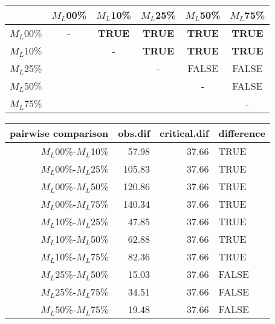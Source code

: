 \begin{tabular}{c|ccccc}
    \hline
              & $M_L$00\% & $M_L$10\% & $M_L$25\% & $M_L$50\% & $M_L$75\% \\
    \hline
    $M_L$00\% & - & \textbf{TRUE} & \textbf{TRUE} & \textbf{TRUE} & \textbf{TRUE}\\
    $M_L$10\% & & - & \textbf{TRUE} & \textbf{TRUE} & \textbf{TRUE} \\
    $M_L$25\% & & & - & FALSE & FALSE \\
    $M_L$50\% & & & & - & FALSE \\
    $M_L$75\% & & & & & - \\
    \hline
\end{tabular}
\centering
\begin{tabular}{rrrl}
 pairwise comparison & obs.dif & critical.dif & difference \\
  \hline
  $M_L$00\%-$M_L$10\% & 57.98 & 37.66 & TRUE \\
  $M_L$00\%-$M_L$25\% & 105.83 & 37.66 & TRUE \\
  $M_L$00\%-$M_L$50\% & 120.86 & 37.66 & TRUE \\
  $M_L$00\%-$M_L$75\% & 140.34 & 37.66 & TRUE \\
  $M_L$10\%-$M_L$25\% & 47.85 & 37.66 & TRUE \\
  $M_L$10\%-$M_L$50\% & 62.88 & 37.66 & TRUE \\
  $M_L$10\%-$M_L$75\% & 82.36 & 37.66 & TRUE \\
  $M_L$25\%-$M_L$50\% & 15.03 & 37.66 & FALSE \\
  $M_L$25\%-$M_L$75\% & 34.51 & 37.66 & FALSE \\
  $M_L$50\%-$M_L$75\% & 19.48 & 37.66 & FALSE \\
   \hline
\end{tabular}